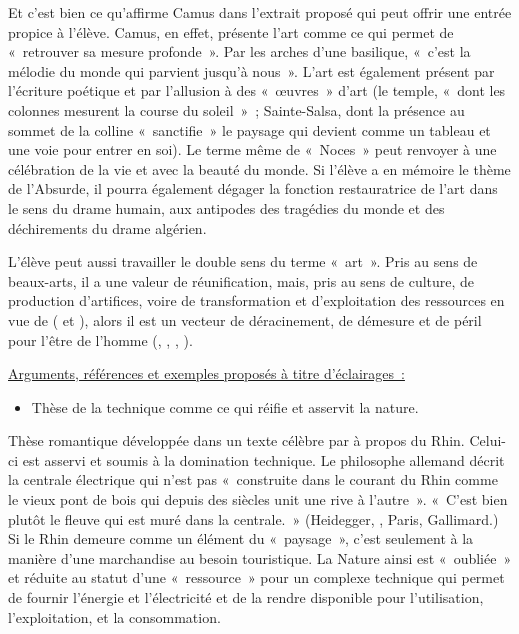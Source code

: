 {Et c'est bien ce qu'affirme Camus dans l'extrait proposé qui peut offrir une entrée propice
à l'élève. Camus, en effet, présente l'art comme ce qui permet de «~retrouver sa mesure profonde~».
Par les arches d'une basilique, «~c'est la mélodie du monde qui parvient jusqu'à nous~». L'art est
également présent par l'écriture poétique et par l'allusion à des «~œuvres~» d'art (le temple, «~dont
les colonnes mesurent la course du soleil~»~; Sainte-Salsa, dont la présence au sommet de la colline
«~sanctifie~» le paysage qui devient comme un tableau et une voie pour entrer en soi). Le terme
même de «~Noces~» peut renvoyer à une célébration de la vie et avec la beauté du monde. Si l'élève
a en mémoire le thème de l'Absurde, il pourra également dégager la fonction restauratrice de l'art
dans le sens du drame humain, aux antipodes des tragédies du monde et des déchirements du drame
algérien.

L'élève peut aussi travailler le double sens du terme «~art~». Pris au sens de beaux-arts, il
a une valeur de réunification, mais, pris au sens de culture, de production d'artifices, voire de
transformation et d'exploitation des ressources en vue de  ( et ), alors il est un vecteur de déracinement, de démesure et de péril
pour l'être de l'homme (, , , ).

\underline{Arguments, références et exemples proposés à titre d'éclairages~:}

\begin{itemize}[label=\textbullet]
\item Thèse de la technique comme ce qui réifie et asservit la nature.
\end{itemize}

Thèse romantique développée dans un texte célèbre par  à propos du Rhin.
Celui-ci est asservi et soumis à la domination technique. Le philosophe allemand décrit la centrale
électrique qui n'est pas «~construite dans le courant du Rhin comme le vieux pont de bois qui depuis
des siècles unit une rive à l'autre~». «~C'est bien plutôt le fleuve qui est muré dans la centrale.~»
(Heidegger, , Paris, Gallimard.) Si le Rhin
demeure comme un élément du «~paysage~», c'est seulement à la manière d'une marchandise au
besoin touristique. La Nature ainsi est «~oubliée~» et réduite au statut d'une «~ressource~» pour un
complexe technique qui permet de fournir l'énergie et l'électricité et de la rendre disponible pour
l'utilisation, l'exploitation, et la consommation.

}
